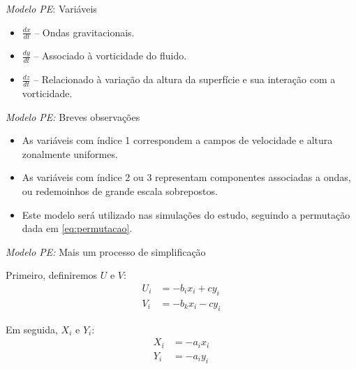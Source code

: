 
\begin{frame}{\textit{Modelo PE}: Variáveis}
    \begin{itemize}
        \item $\frac{dx}{dt}$ – Ondas gravitacionais.
        \item $\frac{dy}{dt}$ – Associado à vorticidade do fluido.
        \item $\frac{dz}{dt}$ – Relacionado à variação da altura da superfície e sua interação com a vorticidade.
    \end{itemize}

\end{frame}


\begin{frame}{\textit{Modelo PE:} Breves observações}

\begin{itemize}
    \item As variáveis com índice 1 correspondem a campos de velocidade e altura zonalmente uniformes.

    \item As variáveis com índice 2 ou 3 representam componentes associadas a ondas, ou redemoinhos de grande escala sobrepostos.

    \item Este modelo será utilizado nas simulações do estudo, seguindo a permutação dada em \eqref{eq:permutacao}.
\end{itemize}

\end{frame}



\begin{frame}{\textit{Modelo PE:} Mais um processo de simplificação}

Primeiro, definiremos $U$ e $V$:
\begin{align}
   U_i &= -b_ix_i + cy_i \\
   V_i &= -b_kx_i - cy_i
\end{align}

Em seguida, $X_i$ e $Y_i$:
\begin{align}
    X_i &= -a_ix_i \\
    Y_i &= -a_iy_i
\end{align}

\end{frame}

